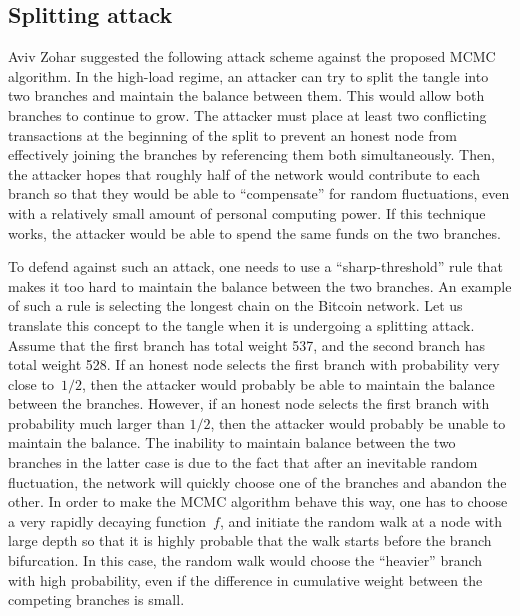 \documentclass[12pt]{article}
\begin{document}
\begin{CJK}{UTF8}{bkai}
\subsection{Splitting attack}
\label{s_splitting}
Aviv Zohar suggested the following attack scheme against the 
proposed MCMC algorithm.
In the high-load regime, 
an attacker can try to split the tangle into two branches 
 and maintain the balance between them.
This would allow both branches to continue to grow.  
The attacker must place at least 
two conflicting transactions at the beginning of the split to prevent an honest node from effectively joining the branches 
by referencing them both simultaneously.
Then, the attacker hopes that roughly half of the network would
contribute to each branch so that they 
would be able to ``compensate'' for random fluctuations,
even with a relatively small amount of personal computing power. 
If this technique works, the attacker would be able to spend the same
funds on the two branches.

To defend against such an attack, one needs to use a
``sharp-threshold'' rule 
that makes it too hard to maintain the balance
between the two branches. An example of such a rule is 
selecting the longest chain on the Bitcoin network. Let us 
translate this concept to the tangle when it is undergoing a 
splitting attack. Assume that
the first branch has total weight 537, and the second branch 
has total weight 528. If an honest
node selects the first branch with probability very close to~$1/2$,
then the attacker would probably be able to maintain the
balance between the branches. However, if an honest
node selects the first branch with probability
much larger than $1/2$, then the attacker would probably
be unable to maintain the
balance. The inability to maintain balance between the two branches in 
the latter case is due to the fact that after an inevitable random fluctuation,
the network will quickly choose one of the branches and abandon the other. 
In order to make the MCMC algorithm behave this way,
one has to choose a very rapidly decaying function~$f$,
and initiate the random walk at a node with
 large depth so that it is highly probable
that the walk starts before the branch bifurcation.
In this case, the random walk would choose the ``heavier''
branch with high probability, even if the difference in
 cumulative weight between the competing branches is small. 


\end{CJK}
\end{document}
